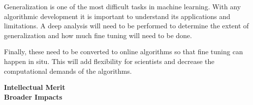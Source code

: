 \documentclass[12pt]{article}
\begin{document}
Generalization is one of the most difficult tasks in machine learning. With any
algorithmic development it is important to understand its applications and
limitations. A deep analysis will need to be performed to determine the extent
of generalization and how much fine tuning will need to be done. 

Finally, these need to be converted to online algorithms so that fine tuning can
happen in situ. This will add flexibility for scientists and decrease the
computational demands of the algorithms. 

\textbf{Intellectual Merit}
\noindent
\\
\textbf{Broader Impacts}
\noindent


\footnotesize
\begin{thebibliography}{aa}


\end{thebibliography}
\end{document}

